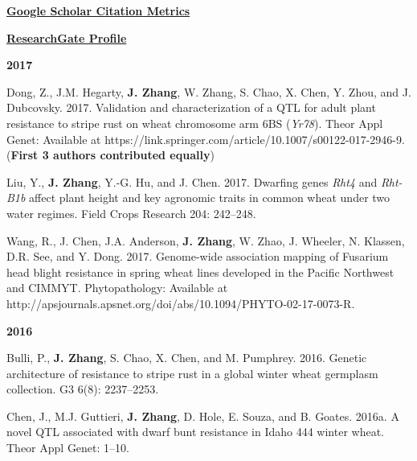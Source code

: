

{
\fontsize{11pt}{1em}\bodyfont\bfseries\aiGoogleScholarSquare\space
\fontsize{11pt}{1em}\bodyfont\bfseries\color{blue}
\href{https://scholar.google.com.au/citations?user=0ZZ8xGYAAAAJ&hl=en}{Google Scholar Citation Metrics}
}

{
\fontsize{11pt}{1em}\bodyfont\bfseries\aiResearchGateSquare\space
\fontsize{11pt}{1em}\bodyfont\bfseries\color{blue}
\href{https://www.researchgate.net/profile/Junli_Zhang6}{ResearchGate Profile}
}

\begin{cventries}
\cventry
{\textbf{2017}}
{}
{}
{}
{
\begin{cvitems}
\setlength\itemsep{0.5em}
	\item {Dong, Z., J.M. Hegarty, \textbf{J. Zhang}, W. Zhang, S. Chao, X. Chen, Y. Zhou, and J. Dubcovsky. 2017. Validation and characterization of a QTL for adult plant resistance to stripe rust on wheat chromosome arm 6BS (\emph{Yr78}). Theor Appl Genet: Available at https://link.springer.com/article/10.1007/s00122-017-2946-9.(\textbf{First 3 authors contributed equally})}
	\item {Liu, Y., \textbf{J. Zhang}, Y.-G. Hu, and J. Chen. 2017. Dwarfing genes \emph{Rht4} and \emph{Rht-B1b} affect plant height and key agronomic traits in common wheat under two water regimes. Field Crops Research 204: 242–248.}
	\item {Wang, R., J. Chen, J.A. Anderson, \textbf{J. Zhang}, W. Zhao, J. Wheeler, N. Klassen, D.R. See, and Y. Dong. 2017. Genome-wide association mapping of Fusarium head blight resistance in spring wheat lines developed in the Pacific Northwest and CIMMYT. Phytopathology: Available at http://apsjournals.apsnet.org/doi/abs/10.1094/PHYTO-02-17-0073-R.}
\end{cvitems}
}
\cventry
{\textbf{2016}}
{}
{}
{}
{
\begin{cvitems}
\setlength\itemsep{0.5em}
	\item {Bulli, P., \textbf{J. Zhang}, S. Chao, X. Chen, and M. Pumphrey. 2016. Genetic architecture of resistance to stripe rust in a global winter wheat germplasm collection. G3 6(8): 2237–2253.}
	\item {Chen, J., M.J. Guttieri, \textbf{J. Zhang}, D. Hole, E. Souza, and B. Goates. 2016a. A novel QTL associated with dwarf bunt resistance in Idaho 444 winter wheat. Theor Appl Genet: 1–10.}

\end{cvitems}}
\end{cventries}
